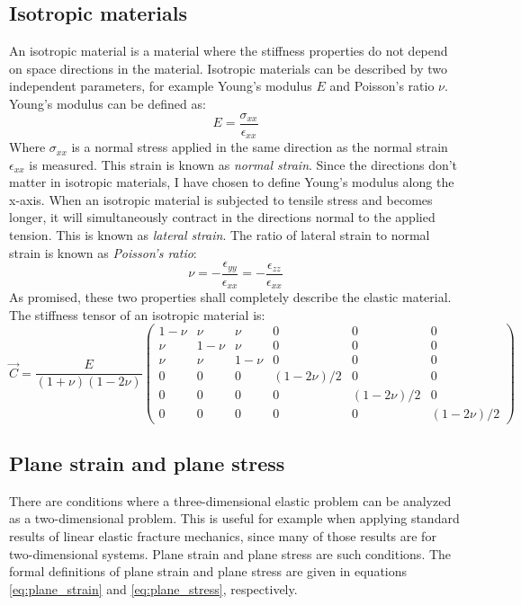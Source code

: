 \subsection{Isotropic materials}
An isotropic material is a material where the stiffness properties do not depend on space directions in the material. Isotropic materials can be described by two independent parameters, for example Young's modulus $E$ and Poisson's ratio $\nu$. 
Young's modulus can be defined as:
\begin{equation}
	E = \frac{\sigma_{xx}}{\epsilon_{xx}}
\end{equation}
Where $\sigma_{xx}$ is a normal stress applied in the same direction as the normal strain $\epsilon_{xx}$ is measured. This strain is known as \emph{normal strain}. Since the directions don't matter in isotropic materials, I have chosen to define Young's modulus along the x-axis. When an isotropic material is subjected to tensile stress and becomes longer, it will simultaneously contract in the directions normal to the applied tension. This is known as \emph{lateral strain}. The ratio of lateral strain to normal strain is known as \emph{Poisson's ratio}:
\begin{equation}
	\nu = -\frac{\epsilon_{yy}}{\epsilon_{xx}} = -\frac{\epsilon_{zz}}{\epsilon_{xx}}
\end{equation}
As promised, these two properties shall completely describe the elastic material. The stiffness tensor of an isotropic material is:
\begin{equation}
	\vec{C} = 
   	\frac{E}{(1+\nu)(1-2\nu)}
   	\begin{pmatrix}
		1-\nu & \nu & \nu & 0 & 0 & 0 \\
		\nu & 1-\nu & \nu & 0 & 0 & 0 \\
		   \nu & \nu & 1-\nu & 0 & 0 & 0 \\
		   0 & 0 & 0 & (1-2\nu)/2 & 0 & 0 \\
		   0 & 0 & 0 & 0 & (1-2\nu)/2 & 0 \\
		   0 & 0 & 0 & 0 & 0 & (1-2\nu)/2
	\end{pmatrix}
\end{equation}

\subsection{Plane strain and plane stress}
There are conditions where a three-dimensional elastic problem can be analyzed as a two-dimensional problem. This is useful for example when applying standard results of linear elastic fracture mechanics, since many of those results are for two-dimensional systems. Plane strain and plane stress are such conditions. The formal definitions of plane strain and plane stress are given in equations \ref{eq:plane_strain} and \ref{eq:plane_stress}, respectively.

